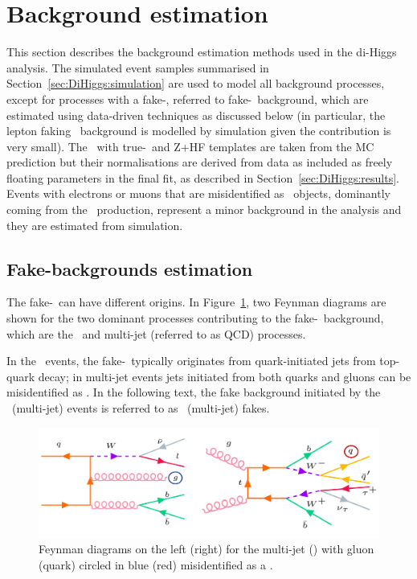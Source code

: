 \section{Background estimation}
\label{sec:DiHiggs:backgroundEstimation}
This section describes the background estimation methods used in the di-Higgs analysis. 
The simulated event samples summarised in Section~\ref{sec:DiHiggs:simulation}
are used to model all background processes, except for processes with a fake-\tauhad,
referred to fake-\tauhad\ background,
which are estimated using data-driven techniques as discussed below 
(in particular, the lepton faking \tauhad\ background is modelled by simulation given 
the contribution is very small). 
The \ttbar\ with true-\tauhad\ and Z+HF templates are taken from the MC prediction
but their normalisations are derived from data 
as included as freely floating parameters in the final fit,
as described in Section~\ref{sec:DiHiggs:results}.
Events with electrons or muons that are misidentified as \tauhad\ objects, 
dominantly coming from the \ttbar\ production, 
represent a minor background in the analysis and they are estimated from simulation. 

\subsection{Fake-\texorpdfstring{\tauhad}\ backgrounds estimation}
\label{sec:DiHiggs:lephadfake}


The fake-\tauhad\ can have different origins. 
In Figure~\ref{fig:fakes:feynman}, two Feynman diagrams are shown
for the two dominant processes contributing to the fake-\tauhad\ background,
which are the \ttbar\ and multi-jet (referred to as QCD) processes. 

In the \ttbar\ events, the fake-\tauhad\ typically originates from quark-initiated jets from 
top-quark decay; in multi-jet events jets initiated from both quarks and gluons can be
misidentified as \tauhad. 
In the following text, the fake background initiated by the 
\ttbar\ (multi-jet) events is referred to as
\ttbar\ (multi-jet) fakes.
\begin{figure}[htbp]
\centering
\includegraphics[width=.84\textwidth]{DiHiggs/plots/feynman_fakes.png} 
\caption{
Feynman diagrams on the left (right) for the multi-jet (\ttbar) with gluon (quark) circled in
blue (red) misidentified as a \tauhad. 
}
\label{fig:fakes:feynman}
\end{figure} 


